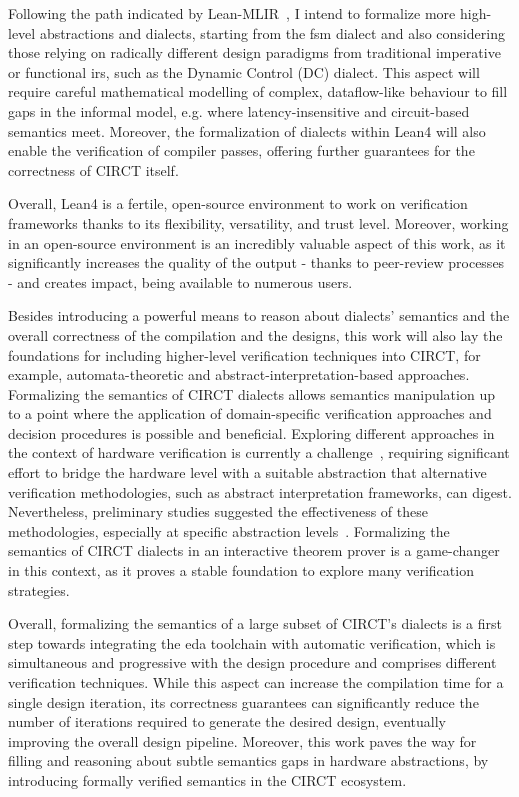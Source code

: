 \documentclass[sigconf,authorversion,nonacm, 11pt]{acmart}
\begin{document}
Following the path indicated by Lean-MLIR~\cite{bhat2024verifying}, I intend to formalize more high-level abstractions and dialects, starting from the \ac{fsm} dialect and also considering those relying on radically different design paradigms from traditional imperative or functional \acp{ir}, such as the Dynamic Control (DC) dialect. 
This aspect will require careful mathematical modelling of complex, dataflow-like behaviour to fill gaps in the informal model, e.g. where latency-insensitive and circuit-based semantics meet. 
Moreover, the formalization of dialects within Lean4 will also enable the verification of compiler passes, offering further guarantees for the correctness of CIRCT itself. 

Overall, Lean4 is a fertile, open-source environment to work on verification frameworks thanks to its flexibility, versatility, and trust level. 
Moreover, working in an open-source environment is an incredibly valuable aspect of this work, as it significantly increases the quality of the output - thanks to peer-review processes - and creates impact, being available to numerous users.  

Besides introducing a powerful means to reason about dialects' semantics and the overall correctness of the compilation and the designs, this work will also lay the foundations for including higher-level verification techniques into CIRCT, for example, automata-theoretic and abstract-interpretation-based approaches. 
Formalizing the semantics of CIRCT dialects allows semantics manipulation up to a point where the application of domain-specific verification approaches and decision procedures is possible and beneficial. 
Exploring different approaches in the context of hardware verification is currently a challenge~\cite{mukherjee2015hardware, malik2008hardware}, requiring significant effort to bridge the hardware level with a suitable abstraction that alternative verification methodologies, such as abstract interpretation frameworks, can digest. 
Nevertheless, preliminary studies suggested the effectiveness of these methodologies, especially at specific abstraction levels~\cite{bernstein2021semantics}. 
Formalizing the semantics of CIRCT dialects in an interactive theorem prover is a game-changer in this context, as it proves a stable foundation to explore many verification strategies.

Overall, formalizing the semantics of a large subset of CIRCT's dialects is a first step towards integrating the \ac{eda} toolchain with automatic verification, which is simultaneous and progressive with the design procedure and comprises different verification techniques. 
While this aspect can increase the compilation time for a single design iteration, its correctness guarantees can significantly reduce the number of iterations required to generate the desired design, eventually improving the overall design pipeline.
Moreover, this work paves the way for filling and reasoning about subtle semantics gaps in hardware abstractions, by introducing formally verified semantics in the CIRCT ecosystem.
\end{document}
